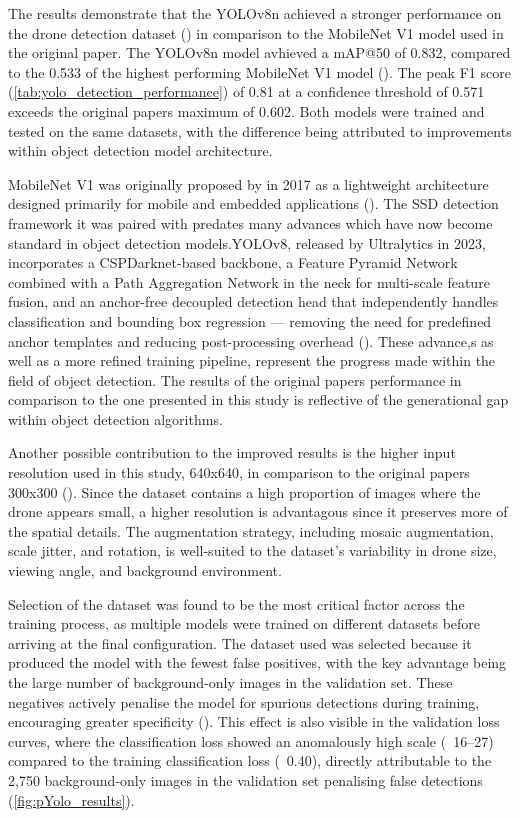 The results demonstrate that the YOLOv8n achieved a stronger performance on the drone detection dataset (\cite{DroneDatasetFinal}) in comparison to the MobileNet V1 model used in the original paper. The YOLOv8n model avhieved a mAP@50 of 0.832, compared to the 0.533 of the highest performing MobileNet V1 model (\cite{DroneDatasetFinal}). The peak F1 score (\ref{tab:yolo_detection_performance}) of 0.81 at a confidence threshold of 0.571 exceeds the original papers maximum of 0.602. Both models were trained and tested on the same datasets, with the difference being attributed to improvements within object detection model architecture.


MobileNet V1 was originally proposed by \cite{howard2017mobilenets} in 2017 as a lightweight architecture designed primarily for mobile and embedded applications (\cite{howard2017mobilenets}). The SSD detection framework it was paired with predates many advances which have now become standard in object detection models.YOLOv8, released by Ultralytics in 2023, incorporates a CSPDarknet-based backbone, a Feature Pyramid Network combined with a Path Aggregation Network in the neck for multi-scale feature fusion, and an anchor-free decoupled detection head that independently handles classification and bounding box regression — removing the need for predefined anchor templates and reducing post-processing overhead (\cite{terven2023comprehensive, jocher2023yolov8}). These advance,s as well as a more refined training pipeline, represent the progress made within the field of object detection. The results of the original papers performance in comparison to the one presented in this study is reflective of the generational gap within object detection algorithms.   

 \vspace{1em}

Another possible contribution to the improved results is the higher input resolution used in this study, 640x640, in comparison to the original papers 300x300 (\cite{DroneDatasetFinal}). Since the dataset contains a high proportion of images where the drone appears small, a higher resolution is advantagous since it preserves more of the spatial details. The augmentation strategy, including mosaic augmentation, scale jitter, and rotation, is well-suited to the dataset's variability in drone size, viewing angle, and background environment.

Selection of the dataset was found to be the most critical factor across the training process, as multiple models were trained on different datasets before arriving at the final configuration. The dataset used was selected because it produced the model with the fewest false positives, with the key advantage being the large number of background-only images in the validation set. These negatives actively penalise the model for spurious detections during training, encouraging greater specificity (\cite{DroneDatasetFinal}). This effect is also visible in the validation loss curves, where the classification loss showed an anomalously high scale (~16–27) compared to the training classification loss (~0.40), directly attributable to the 2,750 background-only images in the validation set penalising false detections (\ref{fig:pYolo_results}).


